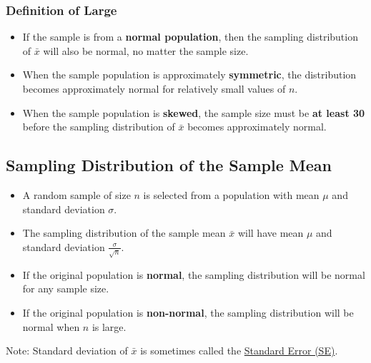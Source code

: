 \documentclass[12pt, letterpaper]{article}
\begin{document}
            \subsubsection{Definition of Large}
            \begin{itemize}
                \item If the sample is from a \textbf{normal population}, then the sampling distribution of $\bar{x}$ will also be normal, no matter the sample size.
                \item When the sample population is approximately \textbf{symmetric}, the distribution becomes approximately normal for relatively small values of $n$.
                \item When the sample population is \textbf{skewed}, the sample size must be \textbf{at least 30} before the sampling distribution of $\bar{x}$ becomes approximately normal.
            \end{itemize}
        \subsection{Sampling Distribution of the Sample Mean}
            \begin{mdframed}[leftmargin=10pt, rightmargin=10pt]
            \begin{itemize}
                \item A random sample of size $n$ is selected from a population with mean $\mu$ and standard deviation $\sigma$.
                \item The sampling distribution of the sample mean $\bar{x}$ will have mean $\mu$ and standard deviation $\frac{\sigma}{\sqrt{n}}$.
                \item If the original population is \textbf{normal}, the sampling distribution will be normal for any sample size.
                \item If the original population is \textbf{non-normal}, the sampling distribution will be normal when $n$ is large. 
            \end{itemize}
            \end{mdframed}
            Note: Standard deviation of $\bar{x}$ is sometimes called the \underline{Standard Error (SE)}.
\end{document}
